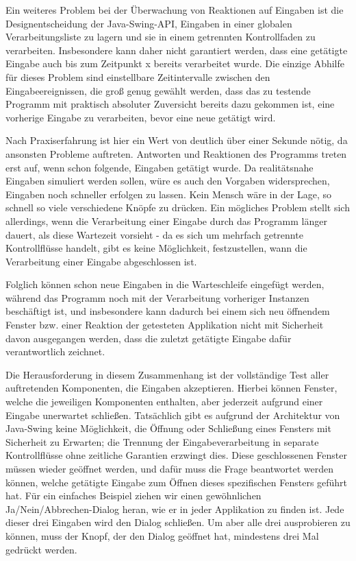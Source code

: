 Ein weiteres Problem bei der Überwachung von Reaktionen auf
Eingaben ist die Designentscheidung der Java-Swing-API,
Eingaben in einer globalen Verarbeitungsliste zu lagern
und sie in einem getrennten Kontrollfaden zu verarbeiten.
Insbesondere kann daher nicht garantiert werden,
dass eine getätigte Eingabe auch bis zum Zeitpunkt x
bereits verarbeitet wurde. Die einzige Abhilfe für dieses
Problem sind einstellbare Zeitintervalle zwischen
den Eingabeereignissen, die groß genug gewählt werden,
dass das zu testende Programm mit praktisch absoluter
Zuversicht bereits dazu gekommen ist, eine vorherige
Eingabe zu verarbeiten, bevor eine neue getätigt wird.

Nach Praxiserfahrung ist hier ein Wert von deutlich über
einer Sekunde nötig, da ansonsten Probleme auftreten. 
Antworten und Reaktionen des Programms treten erst auf,
wenn schon folgende, Eingaben getätigt wurde. Da realitätsnahe
Eingaben simuliert werden sollen, würe es auch den Vorgaben
widersprechen, Eingaben noch schneller erfolgen zu lassen. Kein Mensch
wäre in der Lage, so schnell so viele verschiedene Knöpfe
zu drücken. Ein mögliches Problem stellt sich allerdings,
wenn die Verarbeitung einer Eingabe durch das Programm länger dauert,
als diese Wartezeit vorsieht - da es sich um mehrfach getrennte
Kontrollflüsse handelt, gibt es keine Möglichkeit,
festzustellen, wann die Verarbeitung einer Eingabe abgeschlossen ist.

Folglich können schon neue Eingaben in die Warteschleife
eingefügt werden, während das Programm noch mit der Verarbeitung
vorheriger Instanzen beschäftigt ist, und insbesondere kann
dadurch bei einem sich neu öffnendem Fenster bzw. einer Reaktion
der getesteten Applikation nicht mit Sicherheit davon ausgegangen
werden, dass die zuletzt getätigte Eingabe dafür verantwortlich zeichnet.

Die Herausforderung in diesem Zusammenhang ist der vollständige Test
aller auftretenden Komponenten, die Eingaben akzeptieren. Hierbei
können Fenster, welche die jeweiligen Komponenten enthalten, 
aber jederzeit aufgrund einer Eingabe \glqq{}unerwartet\grqq{} schließen. 
Tatsächlich gibt es aufgrund der Architektur von Java-Swing
keine Möglichkeit, die Öffnung oder Schließung eines Fensters
mit Sicherheit zu Erwarten; die Trennung der Eingabeverarbeitung
in separate Kontrollflüsse ohne zeitliche Garantien erzwingt dies.
Diese geschlossenen Fenster müssen wieder geöffnet werden, und dafür
muss die Frage beantwortet werden können, welche getätigte Eingabe zum
Öffnen dieses spezifischen Fensters geführt hat. Für ein einfaches
Beispiel ziehen wir einen gewöhnlichen Ja/Nein/Abbrechen-Dialog
heran, wie er in jeder Applikation zu finden ist. Jede dieser drei
Eingaben wird den Dialog schließen. Um aber alle drei ausprobieren
zu können, muss der Knopf, der den Dialog geöffnet hat, mindestens drei Mal
gedrückt werden.

